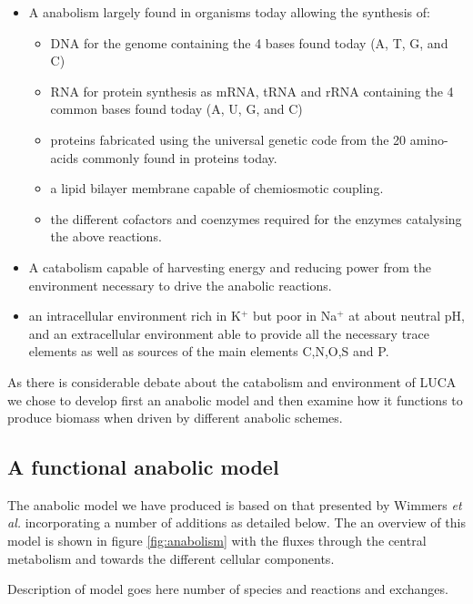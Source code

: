 \documentclass[10pt]{article}
\begin{document}
\begin{itemize}
 \item A anabolism largely found in organisms today allowing the synthesis of:
 \begin{itemize}
     \item DNA for the genome containing the 4 bases found today (A, T, G, and C)
     \item RNA for protein synthesis as mRNA, tRNA and rRNA containing the 4 common bases found today (A, U, G, and C)
     \item proteins fabricated using the universal genetic code from the 20 amino-acids commonly found in proteins today.
     \item a lipid bilayer membrane capable of chemiosmotic coupling.
     \item the different cofactors and coenzymes required for the enzymes catalysing the above reactions.
 \end{itemize}
 \item A catabolism capable of harvesting energy and reducing power from the environment necessary to drive the anabolic reactions.
 \item an intracellular environment rich in K$^+$  but poor in Na$^+$ at about neutral pH, and an extracellular environment able to provide all the necessary trace elements as well as sources of the main elements C,N,O,S and P.

\end{itemize}

As there is considerable debate about the catabolism and environment of LUCA we chose to develop first an anabolic model and then examine how it functions to produce biomass when driven by different anabolic schemes.

\subsection*{A functional anabolic model}
The anabolic model we have produced is based on that presented by Wimmers \textit{et al.} \cite{Wimmers} incorporating a number of additions as detailed below.
The an overview of this model is shown in figure \ref{fig:anabolism} with the fluxes through the central metabolism and towards the different cellular components.

Description of model goes here number of species and reactions and exchanges.
\end{document}
